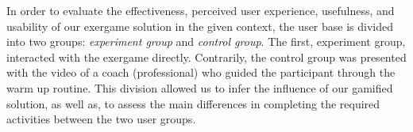 In order to evaluate the effectiveness, perceived user experience, usefulness, and usability of our exergame solution in the given context, the user base is divided into two groups: \textit{experiment group} and \textit{control group}. The first, experiment group, interacted with the exergame directly. Contrarily, the control group was presented with the video of a coach (professional) who guided the participant through the warm up routine. This division allowed us to infer the influence of our gamified solution, as well as, to assess the main differences in completing the required activities between the two user groups. 
